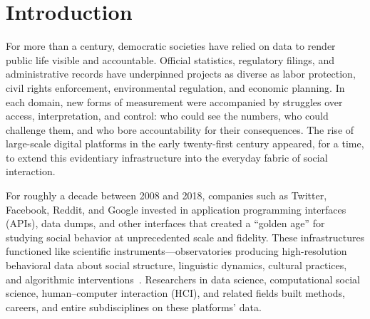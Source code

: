 \documentclass[acmsmall,screen]{acmart}
\begin{document}

\maketitle

\section*{Introduction}


For more than a century, democratic societies have relied on data to render public life visible and accountable. Official statistics, regulatory filings, and administrative records have underpinned projects as diverse as labor protection, civil rights enforcement, environmental regulation, and economic planning. In each domain, new forms of measurement were accompanied by struggles over access, interpretation, and control: who could see the numbers, who could challenge them, and who bore accountability for their consequences. The rise of large-scale digital platforms in the early twenty-first century appeared, for a time, to extend this evidentiary infrastructure into the everyday fabric of social interaction.

For roughly a decade between 2008 and 2018, companies such as Twitter, Facebook, Reddit, and Google invested in application programming interfaces (APIs), data dumps, and other interfaces that created a ``golden age'' for studying social behavior at unprecedented scale and fidelity. These infrastructures functioned like scientific instruments---observatories producing high-resolution behavioral data about social structure, linguistic dynamics, cultural practices, and algorithmic interventions~\cite{Bruns_APIcalypsesocialmedia_2019,lazer_ComputationalSocialScience_2020,proferes_StudyingRedditSystematic_2021,Hampton_StudyingDigitalDirections_2017,GolderDigitalFootprintsOpportunities2014,Lazer_DataexMachina_2017}. Researchers in data science, computational social science, human--computer interaction (HCI), and related fields built methods, careers, and entire subdisciplines on these platforms' data.
\end{document}
